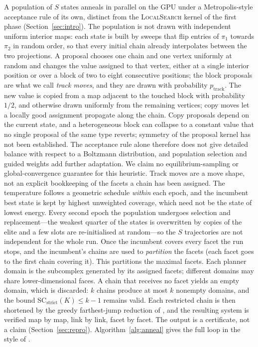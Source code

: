 \documentclass[12pt]{article}
\newcommand{\SC}{\mathrm{SC}}
\newcommand{\SCst}{\SC_{\mathrm{strict}}}
\begin{document}
A population of $S$ states anneals in parallel on the GPU under a
Metropolis-style acceptance rule of its own, distinct from the \textsc{LocalSearch}
kernel of the first phase (Section~\ref{sec:intro}).  The population is
not drawn with independent uniform interior maps: each state is built
by sweeps that flip entries of $\pi_1$ towards $\pi_2$ in random order,
so that every initial chain already interpolates between the two
projections.  A proposal chooses one chain and one vertex uniformly at random and
changes the value assigned to that vertex, either at a single interior
position or over a block of two to eight consecutive positions; the
block proposals are what we call \emph{track moves}, and they are drawn
with probability $p_{\mathrm{track}}$.  The new value is copied from a
map adjacent to the touched block with probability $1/2$, and otherwise
drawn uniformly from the remaining vertices; copy moves let a locally
good assignment propagate along the chain.  Copy proposals depend on
the current state, and a heterogeneous block can collapse to a constant
value that no single proposal of the same type reverts; symmetry of the
proposal kernel has not been established.  The acceptance rule alone
therefore does not give detailed balance with respect to a Boltzmann
distribution, and population selection and guided weights add further
adaptation.  We claim no equilibrium-sampling or global-convergence
guarantee for this heuristic.  Track moves are a move
shape, not an explicit bookkeeping of the facets a chain has been
assigned.  The temperature follows a geometric schedule \emph{within}
each epoch, and the incumbent best state is kept by highest unweighted
coverage, which need not be the state of lowest energy.  Every second
epoch the population undergoes selection and replacement---the weakest
quarter of the states is overwritten by copies of the elite and a few
slots are re-initialised at random---so the $S$ trajectories are not
independent for the whole run.  Once the incumbent covers every facet
the run stops, and the incumbent's chains are used to \emph{partition}
the facets (each facet goes to the first chain covering it).
This partitions the maximal facets. Each planner domain is the subcomplex
generated by its assigned facets; different domains may share
lower-dimensional faces.  A chain that receives no facet yields an empty
domain, which is discarded: $k$ chains produce at most $k$ nonempty
domains, and the bound $\SCst(K)\le k-1$ remains valid.  Each
restricted chain is then shortened by the greedy farthest-jump reduction of
\cite[Algorithm 2]{OLGB21}, and the resulting system is verified map by
map, link by link, facet by facet.  The output is a certificate, not a
claim (Section~\ref{sec:repro}).
Algorithm~\ref{alg:anneal} gives the full loop in the style of
\cite{OLGB21}.
\end{document}
